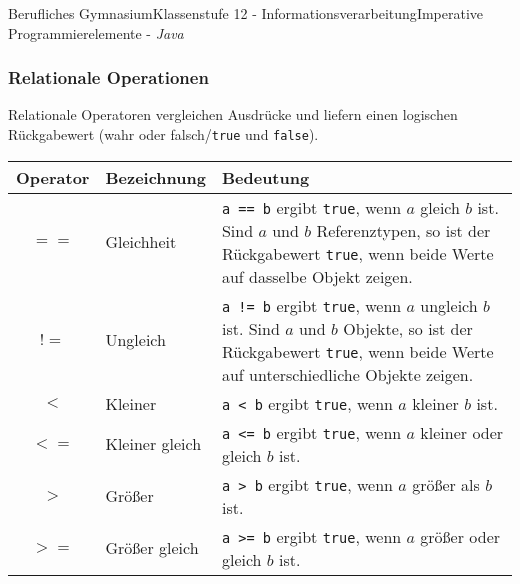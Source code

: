 \documentclass[oneside,openany,headings=optiontotoc,11pt,numbers=noenddot]{article}
\begin{document}
\begin{worksheet}{Berufliches Gymnasium}{Klassenstufe 12 - Informationsverarbeitung}{Imperative Programmierelemente - \textit{Java}}
		\subsubsection{Relationale Operationen}
		Relationale Operatoren vergleichen Ausdrücke und liefern einen logischen Rückgabewert (wahr oder falsch/\lstinline[style=JavaInputStyle]|true| und \lstinline[style=JavaInputStyle]|false|).\\
		\par\noindent
		\begin{tabularx}{\textwidth}{|c|l|X|}
			\hline
			\textbf{Operator} & \textbf{Bezeichnung} & \textbf{Bedeutung}\\
			\hline
			\(==\) & Gleichheit & {\lstinline[style=JavaInputStyle]|a == b|} ergibt {\lstinline[style=JavaInputStyle]|true|}, wenn \(a\) gleich \(b\) ist. Sind \(a\) und \(b\) Referenztypen, so ist der Rückgabewert {\lstinline[style=JavaInputStyle]|true|}, wenn beide Werte auf dasselbe Objekt zeigen.\\
			\hline
			\(!=\) & Ungleich & {\lstinline[style=JavaInputStyle]|a != b|} ergibt {\lstinline[style=JavaInputStyle]|true|}, wenn \(a\) ungleich \(b\) ist. Sind \(a\) und \(b\) Objekte, so ist der Rückgabewert {\lstinline[style=JavaInputStyle]|true|}, wenn beide Werte auf unterschiedliche Objekte zeigen.\\
			\hline
			\(<\) & Kleiner & {\lstinline[style=JavaInputStyle]|a < b|} ergibt {\lstinline[style=JavaInputStyle]|true|}, wenn \(a\) kleiner \(b\) ist.\\
			\hline
			\(<=\) & Kleiner gleich & {\lstinline[style=JavaInputStyle]|a <= b|} ergibt {\lstinline[style=JavaInputStyle]|true|}, wenn \(a\) kleiner oder gleich \(b\) ist.\\
			\hline
			\(>\) & Größer & {\lstinline[style=JavaInputStyle]|a > b|} ergibt {\lstinline[style=JavaInputStyle]|true|}, wenn \(a\) größer als \(b\) ist.\\
			\hline
			\(>=\) & Größer gleich & {\lstinline[style=JavaInputStyle]|a >= b|} ergibt {\lstinline[style=JavaInputStyle]|true|}, wenn \(a\) größer oder gleich \(b\) ist.\\
			\hline
		\end{tabularx}

\end{worksheet}
\end{document}
